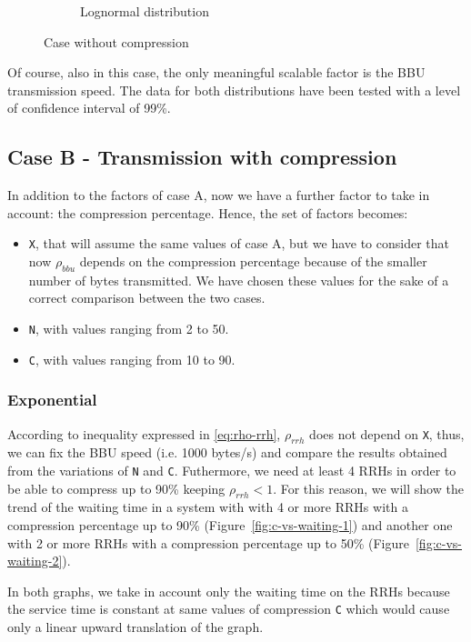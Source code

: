 \documentclass[11pt,a4paper,oneside, openright]{article}
\begin{document}
\begin{figure}
\begin{subfigure}{.5\textwidth}
  \caption{Lognormal distribution}
  \label{fig:case-a-log}
\end{subfigure}
\caption{Case without compression}
\label{fig:case-a}
\end{figure}

Of course, also in this case, the only meaningful scalable factor is the BBU transmission speed.
\bigbreak
\noindent The data for both distributions have been tested with a level of confidence interval of 99\%. 

\subsection{Case B - Transmission with compression}
In addition to the factors of case A, now we have a further factor to take in account: the compression percentage. Hence, the set of factors becomes:

\begin{itemize}
	\item \texttt{X}, that will assume the same values of case A, but we have to consider that now $ \rho_{bbu} $ depends on the compression percentage because of the smaller number of bytes transmitted. We have chosen these values for the sake of a correct comparison between the two cases.
	\item \texttt{N}, with values ranging from 2 to 50.
	\item \texttt{C}, with values ranging from 10 to 90.
\end{itemize}

\subsubsection{Exponential}
According to inequality expressed in \ref{eq:rho-rrh}, $ \rho_{rrh} $ does not depend on \texttt{X}, thus, we can fix the BBU speed (i.e. 1000 bytes/s) and compare the results obtained from the variations of \texttt{N} and \texttt{C}. Futhermore, we need at least 4 RRHs in order to be able to compress up to 90\% keeping $ \rho_{rrh} < 1$. For this reason, we will show the trend of the waiting time in a system with with 4 or more RRHs with a compression percentage up to 90\% (Figure~\ref{fig:c-vs-waiting-1}) and another one with 2 or more RRHs with a compression percentage up to 50\% (Figure~\ref{fig:c-vs-waiting-2}).

In both graphs, we take in account only the waiting time on the RRHs because the service time is constant at same values of compression \texttt{C} which would cause only a linear upward translation of the graph.
\end{document}
